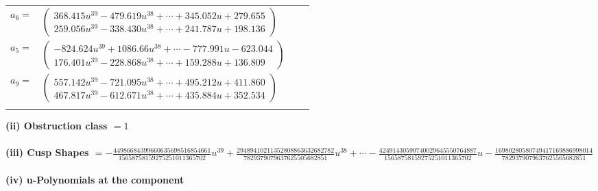 \documentclass[1p]{elsarticle_modified}
\theoremstyle{definition}
\begin{document}
\begin{tabular}{m{7pt} m{180pt} m{7pt} m{180pt} }
\flushright $a_{6}=$&$\begin{pmatrix}368.415 u^{39}-479.619 u^{38}+\cdots+345.052 u+279.655\\259.056 u^{39}-338.430 u^{38}+\cdots+241.787 u+198.136\end{pmatrix}$ \\
\flushright $a_{5}=$&$\begin{pmatrix}-824.624 u^{39}+1086.66 u^{38}+\cdots-777.991 u-623.044\\176.401 u^{39}-228.868 u^{38}+\cdots+159.288 u+136.809\end{pmatrix}$ \\
\flushright $a_{9}=$&$\begin{pmatrix}557.142 u^{39}-721.095 u^{38}+\cdots+495.212 u+411.860\\467.817 u^{39}-612.671 u^{38}+\cdots+435.884 u+352.534\end{pmatrix}$\\&\end{tabular}
\flushleft \textbf{(ii) Obstruction class $= 1$}\\~\\
\flushleft \textbf{(iii) Cusp Shapes $= -\frac{44986684399660635698516854661}{15658758159275251011365702} u^{39}+\frac{29489410211352808863632682782}{7829379079637625505682851} u^{38}+\cdots-\frac{42491430590740029645550764887}{15658758159275251011365702} u-\frac{16980280580749417169886998014}{7829379079637625505682851}$}\\~\\
\newpage\renewcommand{\arraystretch}{1}
\flushleft \textbf{(iv) u-Polynomials at the component}\newline \\
\end{document}
